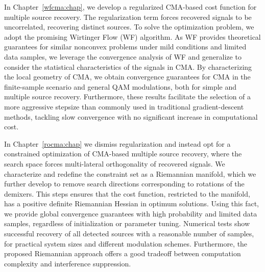 In Chapter~\ref{wfcma:chap}, we develop a regularized CMA-based cost function for multiple source recovery. The regularization term forces recovered signals to be uncorrelated, recovering distinct sources. To solve the optimization problem, we adopt the promising Wirtinger Flow (WF) algorithm. As WF provides theoretical guarantees for similar nonconvex problems under mild conditions and limited data samples, we leverage the convergence analysis of WF and generalize to consider the statistical characteristics of the signals in CMA. By characterizing the local geometry of CMA, we obtain convergence guarantees for CMA in the finite-sample scenario and general QAM modulations, both for simple and multiple source recovery. Furthermore, these results facilitate the selection of a more aggressive stepsize than commonly used in traditional gradient-descent methods, tackling slow convergence with no significant increase in computational cost.

In Chapter~\ref{rocma:chap} we dismiss regularization and instead opt for a constrained optimization of CMA-based multiple source recovery, where the search space forces multi-lateral orthogonality of recovered signals. We characterize and redefine the constraint set as a Riemannian manifold, which we further develop to remove search directions corresponding to rotations of the demixers. This steps ensures that the cost function, restricted to the manifold, has a positive definite Riemannian Hessian in optimum solutions. Using this fact, we provide global convergence guarantees with high probability and limited data samples, regardless of initialization or parameter tuning. Numerical tests show successful recovery of all detected sources with a reasonable number of samples, for practical system sizes and different modulation schemes. Furthermore, the proposed Riemannian approach offers a good tradeoff between computation complexity and interference suppression. 




